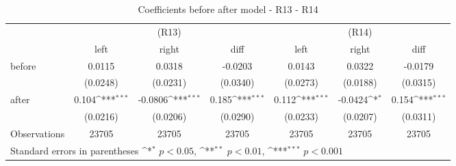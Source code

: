 \begin{table}[!ht]\centering \footnotesize
\def\sym#1{\ifmmode^{#1}\else\(^{#1}\)\fi}
\caption{Coefficients before after model - R13 - R14}
\begin{tabular}{l*{6}{c}}
\hline\hline
                     &\multicolumn{3}{c}{(R13)}&\multicolumn{3}{c}{(R14)}\\
 &\multicolumn{1}{c}{left}&\multicolumn{1}{c}{right}&\multicolumn{1}{c}{diff}&\multicolumn{1}{c}{left}&\multicolumn{1}{c}{right}&\multicolumn{1}{c}{diff}\\
 \hline
before              &      0.0115         &      0.0318         &     -0.0203         &      0.0143         &      0.0322         &     -0.0179         \\
                    &    (0.0248)         &    (0.0231)         &    (0.0340)         &    (0.0273)         &    (0.0188)         &    (0.0315)         \\
[0.5em]
after               &       0.104\sym{***}&     -0.0806\sym{***}&       0.185\sym{***}&       0.112\sym{***}&     -0.0424\sym{*}  &       0.154\sym{***}\\
                    &    (0.0216)         &    (0.0206)         &    (0.0290)         &    (0.0233)         &    (0.0207)         &    (0.0311)         \\
\hline
Observations        &       23705         &       23705         &       23705         &       23705         &       23705         &       23705         \\
\hline\hline
\multicolumn{7}{l}{ Standard errors in parentheses \sym{*} \(p<0.05\), \sym{**} \(p<0.01\), \sym{***} \(p<0.001\)}\\
\end{tabular}
\end{table}
